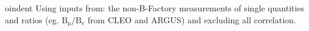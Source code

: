 
oindent Using inputs from: the non-B-Factory measurements of single quantities and ratios (eg. $\mathrm{B_\mu/B_e}$ from CLEO and ARGUS) and excluding all correlation.
